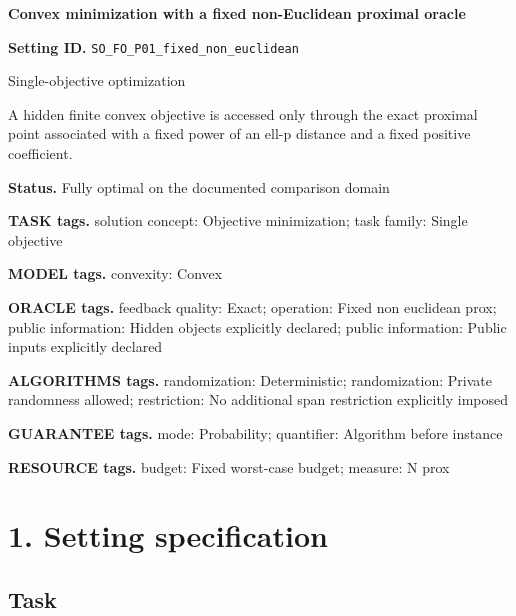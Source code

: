 \documentclass[10pt,a4paper]{article}
\begin{document}
\raggedright

{\LARGE\bfseries\sffamily\color{AtlasNavy} Convex minimization with a fixed non-Euclidean proximal oracle\par}\vspace{5pt}


\textbf{Setting ID.} \texttt{SO\_\allowbreak{}FO\_\allowbreak{}P01\_\allowbreak{}fixed\_\allowbreak{}non\_\allowbreak{}euclidean}



Single-objective optimization



A hidden finite convex objective is accessed only through the exact proximal point associated with a fixed power of an ell-p distance and a fixed positive coefficient.



\textbf{Status.} Fully optimal on the documented comparison domain



\textbf{TASK tags.} solution concept: Objective minimization; task family: Single objective



\textbf{MODEL tags.} convexity: Convex



\textbf{ORACLE tags.} feedback quality: Exact; operation: Fixed non euclidean prox; public information: Hidden objects explicitly declared; public information: Public inputs explicitly declared



\textbf{ALGORITHMS tags.} randomization: Deterministic; randomization: Private randomness allowed; restriction: No additional span restriction explicitly imposed



\textbf{GUARANTEE tags.} mode: Probability; quantifier: Algorithm before instance



\textbf{RESOURCE tags.} budget: Fixed worst-case budget; measure: N prox



\section{1. Setting specification}


\subsection{Task}
\end{document}
